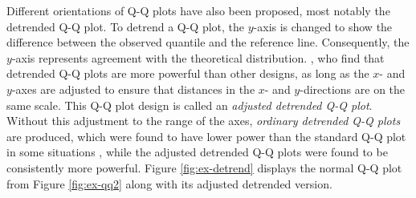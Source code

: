 Different orientations of Q-Q plots have also been proposed, most
notably the detrended Q-Q plot. To detrend a Q-Q plot, the \(y\)-axis is
changed to show the difference between the observed quantile and the
reference line. Consequently, the \(y\)-axis represents agreement with
the theoretical distribution.
 \citet{Loy2016-fg}, who find that
detrended Q-Q plots are more powerful than other designs, as long as the
\(x\)- and \(y\)-axes are adjusted to ensure that distances in the
\(x\)- and \(y\)-directions are on the same scale. This Q-Q plot design
is called an \emph{adjusted detrended Q-Q plot}. Without this adjustment
to the range of the axes, \emph{ordinary detrended Q-Q plots} are
produced, which were found to have lower power than the standard Q-Q
plot in some situations \citep{Loy2016-fg}, while the adjusted detrended
Q-Q plots were found to be consistently more powerful. Figure
\ref{fig:ex-detrend} displays the normal Q-Q plot from Figure
\ref{fig:ex-qq2} along with its adjusted detrended version.

